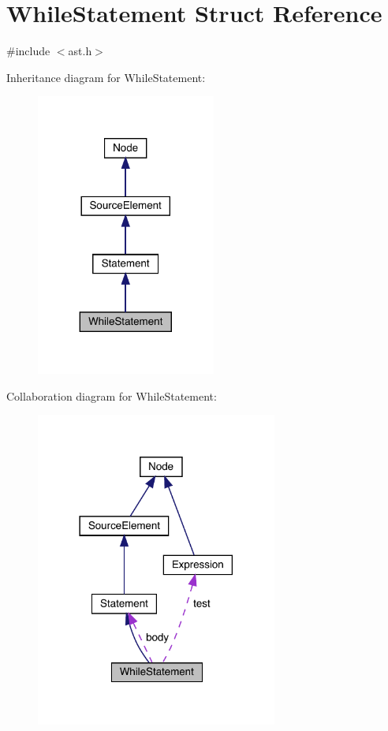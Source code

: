 \hypertarget{struct_while_statement}{}\section{While\+Statement Struct Reference}
\label{struct_while_statement}


{\ttfamily \#include $<$ast.\+h$>$}



Inheritance diagram for While\+Statement\+:\nopagebreak
\begin{figure}[H]
\begin{center}
\leavevmode
\includegraphics[width=167pt]{struct_while_statement__inherit__graph}
\end{center}
\end{figure}


Collaboration diagram for While\+Statement\+:\nopagebreak
\begin{figure}[H]
\begin{center}
\leavevmode
\includegraphics[width=225pt]{struct_while_statement__coll__graph}
\end{center}
\end{figure}
